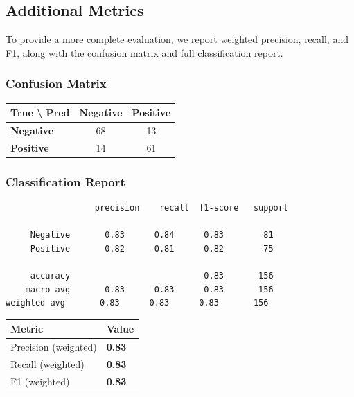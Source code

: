 \documentclass[11pt,a4paper]{article}
\begin{document}
\subsection{Additional Metrics}

To provide a more complete evaluation, we report weighted precision, recall, and F1, along with the confusion matrix and full classification report.

\subsubsection{Confusion Matrix}

\begin{center}
\begin{tabular}{lcc}
\toprule
\textbf{True \textbackslash{} Pred} & \textbf{Negative} & \textbf{Positive} \\
\midrule
\textbf{Negative} & 68 & 13 \\
\textbf{Positive} & 14 & 61 \\
\bottomrule
\end{tabular}
\end{center}

\subsubsection{Classification Report}

\begin{lstlisting}
                  precision    recall  f1-score   support

     Negative       0.83      0.84      0.83        81
     Positive       0.82      0.81      0.82        75

     accuracy                           0.83       156
    macro avg       0.83      0.83      0.83       156
weighted avg       0.83      0.83      0.83       156
\end{lstlisting}

\begin{center}
\begin{tabular}{ll}
\toprule
\textbf{Metric} & \textbf{Value} \\
\midrule
Precision (weighted) & \textbf{0.83} \\
Recall (weighted)    & \textbf{0.83} \\
F1 (weighted)        & \textbf{0.83} \\
\bottomrule
\end{tabular}
\end{center}
\end{document}
